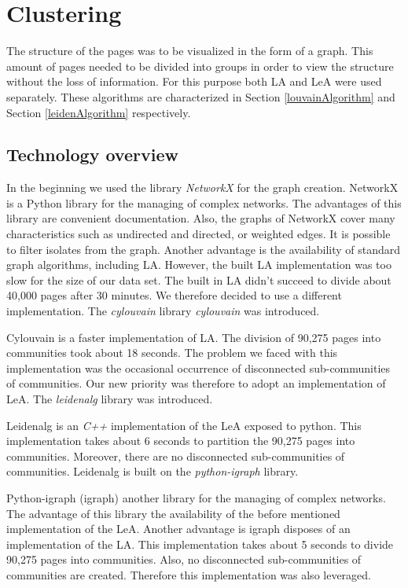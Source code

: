 \section{Clustering}\label{ClusteringDevelopment}
The structure of the pages was to be visualized in the form of a graph. This amount of pages needed to be divided into groups in order to view the structure without the loss of information. For this purpose both LA and LeA were used separately. These algorithms are characterized in Section \ref{louvainAlgorithm} and Section \ref{leidenAlgorithm} respectively. 

\subsection{Technology overview} \label{ClusteringTechonologyOverview}
In the beginning we used the library \textit{NetworkX} \cite{networkX} for the graph creation. NetworkX is a Python library for the managing of complex networks. The advantages of this library are convenient documentation. Also, the graphs of NetworkX cover many characteristics such as undirected and directed, or weighted edges. It is possible to filter isolates from the graph.  Another advantage is the availability of standard graph algorithms, including LA. However, the built LA implementation was too slow for the size of our data set. The built in LA didn't succeed to divide about 40,000 pages after 30 minutes. We therefore decided to use a different implementation. The \textit{cylouvain} library \textit{cylouvain} was introduced. 

Cylouvain is a faster implementation of LA. The division of 90,275 pages into communities took about 18 seconds. The problem we faced with this implementation was the occasional occurrence of disconnected sub-communities of communities. Our new priority was therefore to adopt an implementation of LeA. The \textit{leidenalg} \cite{leidenalg} library was introduced.

Leidenalg is an \textit{C++} implementation of the LeA exposed to python. This implementation takes about 6 seconds to partition the 90,275 pages into communities. Moreover, there are no disconnected sub-communities of communities. Leidenalg is built on the \textit{python-igraph} library. 

Python-igraph (igraph) another library for the managing of complex networks. The advantage of this library the availability of the before mentioned implementation of the LeA. Another advantage is igraph disposes of an implementation of the LA. This implementation takes about 5 seconds to divide 90,275 pages into communities. Also, no disconnected sub-communities of communities are created. Therefore this implementation was also leveraged.

